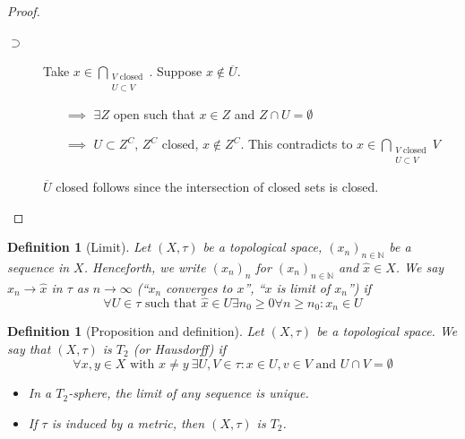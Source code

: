 \documentclass[a4paper]{article}
\newcounter{lecref}[section]
\numberwithin{lecref}{section}
\newtheorem{definition}[lecref]{Definition}
\begin{document}
\begin{proof}
\begin{enumerate}
\begin{description}
				\item[$\supset$]
					Take $x \in \bigcap_{\substack{V \text{ closed} \\ U \subset V}}$. Suppose $x \not\in \overline U$.
					\begin{itemize}
						\item[$\implies$] $\exists Z$ open such that $x \in Z$ and $Z \cap U = \emptyset$
						\item[$\implies$] $U \subset Z^C$, $Z^C$ closed, $x \not\in Z^C$. This contradicts to $x \in \bigcap_{\substack{V \text{ closed} \\ U \subset V}} V$
					\end{itemize}
					$\overline U$ closed follows since the intersection of closed sets is closed.
			\end{description}
	\end{enumerate}
\end{proof}

\begin{definition}[Limit]
	\label{definition:1.7}
	Let $(X, \tau)$ be a topological space, $(x_n)_{n \in \mathbb N}$ be a sequence in $X$. Henceforth, we write $(x_n)_{n}$ for $(x_n)_{n \in \mathbb N}$ and $\hat x \in X$. We say $x_n \to \hat x$ in $\tau$ as $n \to \infty$ (\enquote{$x_n$ converges to $x$}, \enquote{$x$ is limit of $x_n$}) if
	\[ \forall U \in \tau \text{ such that } \hat x \in U \exists n_0 \geq 0 \forall n \geq n_0: x_n \in U \]
\end{definition}

\begin{definition}[Proposition and definition]
	\label{definition:1.8}
	Let $(X, \tau)$ be a topological space. We say that $(X, \tau)$ is $T_2$ (or Hausdorff) if
	\[ \forall x, y \in X \text{ with } x \neq y \: \exists U, V \in \tau: x \in U, v \in V \text{ and } U \cap V = \emptyset \]
	\begin{itemize}
		\item In a $T_2$-sphere, the limit of any sequence is unique.
		\item If $\tau$ is induced by a metric, then $(X, \tau)$ is $T_2$.
	\end{itemize}
\end{definition}
\end{document}

